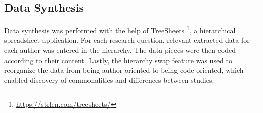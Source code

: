 \subsection{Data Synthesis}
Data synthesis was performed with the help of TreeSheets \footnote{\url{https://strlen.com/treesheets/}}, a hierarchical spreadsheet application.
For each research question, relevant extracted data for each author was entered in the hierarchy.
The data pieces were then coded according to their content.
Lastly, the hierarchy swap feature was used to reorganize the data from being author-oriented to being code-oriented, which enabled discovery of commonalities and differences between studies.